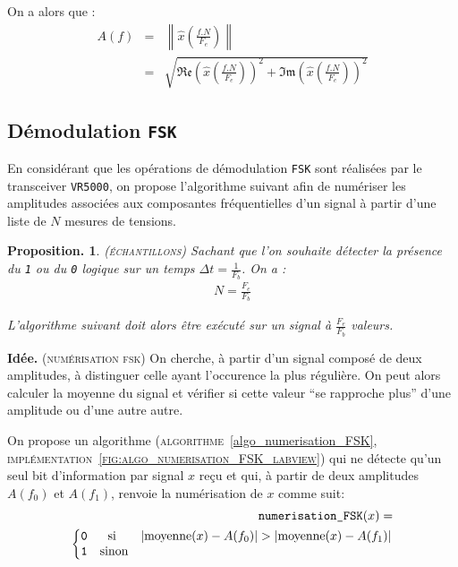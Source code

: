\documentclass[twocolumn,pre,floats,aps,amsmath,amssymb]{revtex4}
\newtheorem{proposition}[theorem]{Proposition.}
\begin{document}
On a alors que\cite{Senlis} :
\begin{eqnarray*}
  A (f) &=& \left \| \hat{x} \left (\frac{f.N}{F_e} \right ) \right \|\\
           &=& \sqrt{\mathfrak{Re} \left ( \hat{x} \left (\frac{f.N}{F_e} \right ) \right )^2 + \mathfrak{Im} \left ( \hat{x} \left (\frac{f.N}{F_e} \right ) \right )^2}
\end{eqnarray*}

\subsection{D\'emodulation \texttt{FSK}}

En consid\'erant que les op\'erations de d\'emodulation \texttt{FSK} sont r\'ealis\'ees par le transceiver \texttt{VR5000}, on propose l'algorithme suivant afin de num\'eriser les amplitudes associ\'ees aux composantes fr\'equentielles d'un signal \`a partir d'une liste de $N$ mesures de tensions.

\begin{proposition}
  \textsc{(\'echantillons)}
  Sachant que l'on souhaite d\'etecter la pr\'esence du \texttt{1} ou du \texttt{0} logique sur un temps $\Delta t = \frac{1}{F_b}$. On a :
  \begin{eqnarray}
    N = \frac{F_e}{F_b}
  \end{eqnarray}

L'algorithme suivant doit alors \^etre ex\'ecut\'e sur un signal \`a $\frac{F_e}{F_b}$ valeurs.
\end{proposition}

\noindent
\textbf{Id\'ee.}
\textsc{(num\'erisation fsk)}
  On cherche, \`a partir d'un signal compos\'e de deux amplitudes, \`a distinguer celle ayant l'occurence la plus r\'eguli\`ere. On peut alors calculer la moyenne du signal et v\'erifier si cette valeur ``se rapproche plus'' d'une amplitude ou d'une autre autre.

On propose un algorithme (\textsc{algorithme}~\ref{algo_numerisation_FSK}, \textsc{impl\'ementation~\ref{fig:algo_numerisation_FSK_labview}}) qui ne d\'etecte qu'un seul bit d'information par signal $x$ re\c{c}u et qui, \`a partir de deux amplitudes $A(f_0)$ et $A(f_1)$, renvoie la num\'erisation de $x$ comme suit:
  \begin{eqnarray*}
    \texttt{numerisation\_FSK} (x) =\\
    \left\{\begin{matrix}
    \texttt{0} &\textup{si }& \left | \operatorname{moyenne}(x) - A(f_0) \right | > \left | \operatorname{moyenne}(x) - A(f_1) \right |\\ 
    \texttt{1} &\textup{sinon}&
    \end{matrix}\right.
  \end{eqnarray*}
\end{document}
